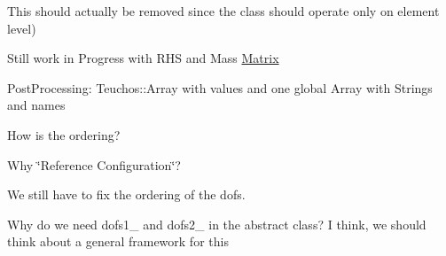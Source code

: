 
\begin{DoxyRefList}
\item[Class \mbox{\hyperlink{classFEDD_1_1AssembleFE}{F\+E\+DD::Assemble\+FE$<$ SC, LO, GO, NO $>$}} ]\label{todo__todo000001}%
%
This should actually be removed since the class should operate only on element level)  
\item[Member \mbox{\hyperlink{classFEDD_1_1AssembleFE_a9eea5124c4b385c2807ad8b20614d050}{F\+E\+DD::Assemble\+FE$<$ SC, LO, GO, NO $>$::add\+R\+H\+S\+Func}} (Rhs\+Func\+\_\+\+Type rhs\+Func)]\label{todo__todo000005}%
%
Still work in Progress with R\+HS and Mass \mbox{\hyperlink{classFEDD_1_1Matrix}{Matrix}}  
\item[Member \mbox{\hyperlink{classFEDD_1_1AssembleFE_a35ada89164c74b433340733c01f30f4b}{F\+E\+DD::Assemble\+FE$<$ SC, LO, GO, NO $>$::get\+Dim}} ()]\label{todo__todo000003}%
%
Post\+Processing\+: Teuchos\+::\+Array with values and one global Array with Strings and names  
\item[Member \mbox{\hyperlink{classFEDD_1_1AssembleFE_a93f37b5e5f8f9a73152abb2e8be4ba4f}{F\+E\+DD::Assemble\+FE$<$ SC, LO, GO, NO $>$::get\+Nodes\+Ref\+Config}} ()]\label{todo__todo000004}%
%
How is the ordering?  
\item[Member \mbox{\hyperlink{classFEDD_1_1AssembleFE_ab2892bff598d5a4f784d4f30ddf4836c}{F\+E\+DD::Assemble\+FE$<$ SC, LO, GO, NO $>$::nodes\+Ref\+Config\+\_\+}} ]\label{todo__todo000006}%
%
Why \char`\"{}\+Reference Configuration\char`\"{}?  
\item[Member \mbox{\hyperlink{classFEDD_1_1AssembleFE_a5303adf0752fe27d9ff47ae8a39c1da4}{F\+E\+DD::Assemble\+FE$<$ SC, LO, GO, NO $>$::update\+Solution}} (vec\+\_\+dbl\+\_\+\+Type solution)]\label{todo__todo000002}%
%
We still have to fix the ordering of the dofs.  
\item[Member \mbox{\hyperlink{classFEDD_1_1AssembleFENavierStokes_a168f5a32fb986964e4b2a126f3a092d5}{F\+E\+DD::Assemble\+F\+E\+Navier\+Stokes$<$ SC, LO, GO, NO $>$::dofs\+Velocity\+\_\+}} ]\label{todo__todo000008}%
%
Why do we need dofs1\+\_\+ and dofs2\+\_\+ in the abstract class? I think, we should think about a general framework for this 


\end{DoxyRefList}
